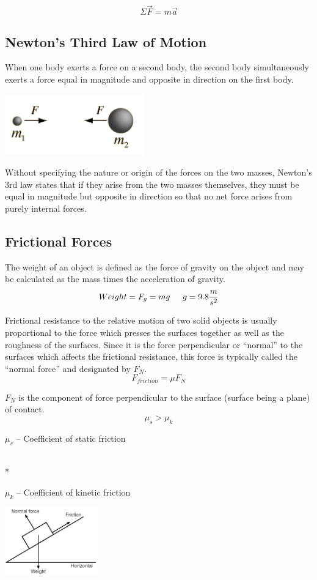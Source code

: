 \documentclass{article}
\begin{document}
\[\Sigma\vec{F}=m\vec{a}\]

\subsection{Newton's Third Law of Motion}

When one body exerts a force on a second body, the second body simultaneously exerts a force equal in magnitude and opposite in direction on the first body.
\begin{multicols}{2}
\centerline{\includegraphics[width=6cm]{thirdLaw.png}}
\columnbreak
Without specifying the nature or origin of the forces on the two masses, Newton's 3rd law states that if they arise from the two masses themselves, they must be equal in magnitude but opposite in direction so that no net force arises from purely internal forces.
\end{multicols}

\subsection{Frictional Forces}

The weight of an object is defined as the force of gravity on the object and may be calculated as the mass times the acceleration of gravity.
\[Weight=F_g=mg \indent g=9.8\frac{m}{s^2}\]

Frictional resistance to the relative motion of two solid objects is usually proportional to the force which presses the surfaces together as well as the roughness of the surfaces. Since it is the force perpendicular or ``normal'' to the surfaces which affects the frictional resistance, this force is typically called the ``normal force'' and designated by $F_N$.
\[F_{friction}=\mu F_N\]
\begin{multicols}{2}
\noindent$F_N$ is the component of force perpendicular to the surface (surface being a plane) of contact.
\[\mu_s>\mu_k\]
\centerline{$\mu_s$ -- Coefficient of static friction}\\*
\centerline{$\mu_k$ -- Coefficient of kinetic friction}
\columnbreak
\centerline{\includegraphics[width=4cm]{normalForce.png}}
\end{multicols}
\end{document}
